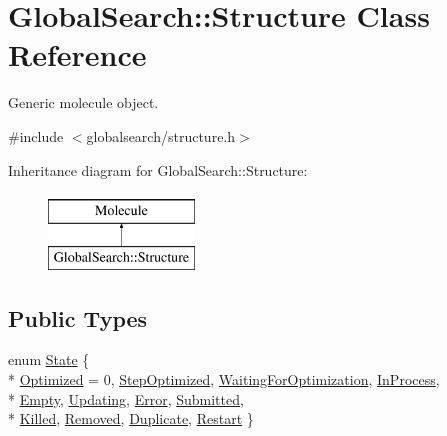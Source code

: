 \hypertarget{classGlobalSearch_1_1Structure}{\section{Global\-Search\-:\-:Structure Class Reference}
\label{classGlobalSearch_1_1Structure}
}


Generic molecule object.  




{\ttfamily \#include $<$globalsearch/structure.\-h$>$}

Inheritance diagram for Global\-Search\-:\-:Structure\-:\begin{figure}[H]
\begin{center}
\leavevmode
\includegraphics[height=2.000000cm]{classGlobalSearch_1_1Structure}
\end{center}
\end{figure}
\subsection*{Public Types}
\begin{DoxyCompactItemize}
\item 
enum \hyperlink{classGlobalSearch_1_1Structure_a3f1e44cb4f603fe1b3fbc8e813535917}{State} \{ \\*
\hyperlink{classGlobalSearch_1_1Structure_a3f1e44cb4f603fe1b3fbc8e813535917a75ed0969285b99dc1e54c654428be5e0}{Optimized} = 0, 
\hyperlink{classGlobalSearch_1_1Structure_a3f1e44cb4f603fe1b3fbc8e813535917ae572101eab4010061be0073888fbee39}{Step\-Optimized}, 
\hyperlink{classGlobalSearch_1_1Structure_a3f1e44cb4f603fe1b3fbc8e813535917ad4d8f76770421b6ab8d39f60e280a0a0}{Waiting\-For\-Optimization}, 
\hyperlink{classGlobalSearch_1_1Structure_a3f1e44cb4f603fe1b3fbc8e813535917a4f451a4c3de6ed294e1c7d06e5b1d24c}{In\-Process}, 
\\*
\hyperlink{classGlobalSearch_1_1Structure_a3f1e44cb4f603fe1b3fbc8e813535917a1639a0fd1ec7f1bba6cdaf73a2e76582}{Empty}, 
\hyperlink{classGlobalSearch_1_1Structure_a3f1e44cb4f603fe1b3fbc8e813535917ae64ed17fe917f0b8fd679078b5b12447}{Updating}, 
\hyperlink{classGlobalSearch_1_1Structure_a3f1e44cb4f603fe1b3fbc8e813535917a6b33b578b7e228f289720292019a998a}{Error}, 
\hyperlink{classGlobalSearch_1_1Structure_a3f1e44cb4f603fe1b3fbc8e813535917a5a0e4ad5830e2c3a9b045da79098b6c7}{Submitted}, 
\\*
\hyperlink{classGlobalSearch_1_1Structure_a3f1e44cb4f603fe1b3fbc8e813535917acd16cf0031d5e5b522b61618fd73fdc1}{Killed}, 
\hyperlink{classGlobalSearch_1_1Structure_a3f1e44cb4f603fe1b3fbc8e813535917ac5686d195648a0800584c59d034e8be0}{Removed}, 
\hyperlink{classGlobalSearch_1_1Structure_a3f1e44cb4f603fe1b3fbc8e813535917a1cd89f1eb6cab53ae2bb1b2ad64dfe72}{Duplicate}, 
\hyperlink{classGlobalSearch_1_1Structure_a3f1e44cb4f603fe1b3fbc8e813535917a99c42cb7635428e83d759cdae79209ec}{Restart}
 \}
\end{DoxyCompactItemize}
